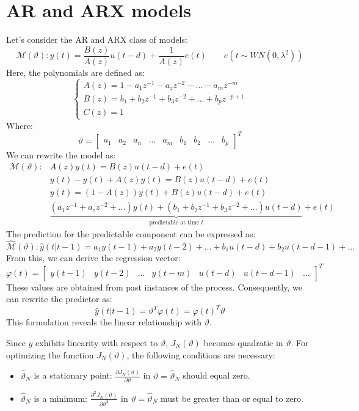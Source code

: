 \section{AR and ARX models}

Let's consider the AR and ARX class of models:
\[\mathcal{M}(\vartheta): y(t)=\dfrac{B(z)}{A(z)}u(t-d)+\dfrac{1}{A(z)}e(t)\qquad e(t \sim WN(0,\lambda^2))\]
Here, the polynomials are defined as:
\[\begin{cases}
    A(z)=1-a_1z^{-1}-a_zz^{-2}-\dots-a_mz^{-m} \\
    B(z)=b_1+b_2z^{-1}+b_3z^{-2}+\dots+b_pz^{-p+1} \\
    C(z)=1
\end{cases}\]
Where: 
\[\vartheta=\begin{bmatrix}
    a_1 & a_2 & a_n & \dots & a_m & b_1 & b_2 & \dots & b_p
\end{bmatrix}^T\]
We can rewrite the model as:
\begin{align*}
    \mathcal{M}(\vartheta): &A(z)y(t)=B(z)u(t-d)+e(t) \\
                            &y(t)-y(t)+A(z)y(t)=B(z)u(t-d)+e(t) \\
                            &y(t)=(1-A(z))y(t)+B(z)u(t-d)+e(t) \\
                            &\underbrace{\left(a_1z^{-1}+a_zz^{-2}+\dots\right)y(t) + \left(b_1+b_2z^{-1}+b_3z^{-2}+\dots\right)u(t-d)}_{\text{predictable at time } t} +e(t)
\end{align*}
The prediction for the predictable component can be expressed as:
\[\hat{\mathcal{M}}(\vartheta):\hat{y}(t|t-1)=a_1y(t-1)+a_2y(t-2)+\dots+b_1u(t-d)+b_2u(t-d-1)+\dots\]
From this, we can derive the regression vector:
\[\varphi(t)=\begin{bmatrix}
    y(t-1) & y(t-2) & \dots & y(t-m) & u(t-d) & u(t-d-1) & \dots
\end{bmatrix}^T\]
These values are obtained from past instances of the process. 
Consequently, we can rewrite the predictor as:
\[\hat{y}(t|t-1)=\vartheta^T\varphi(t)=\varphi(t)^T\vartheta\]
This formulation reveals the linear relationship with $\vartheta$.

Since $\hat{y}$ exhibits linearity with respect to $\vartheta$, $J_N(\vartheta)$ becomes quadratic in $\vartheta$. 
For optimizing the function $J_N(\vartheta)$, the following conditions are necessary:
\begin{itemize}
    \item $\hat{\vartheta}_N$ is a stationary point: $\frac{\partial J_N(\vartheta)}{\partial\vartheta}$ in $\vartheta=\hat{\vartheta}_N$ should equal zero.
    \item $\hat{\vartheta}_N$ is a minimum: $\frac{\partial^2 J_N(\vartheta)}{\partial\vartheta^2}$ in $\vartheta=\hat{\vartheta}_N$ must be greater than or equal to zero.
\end{itemize}

